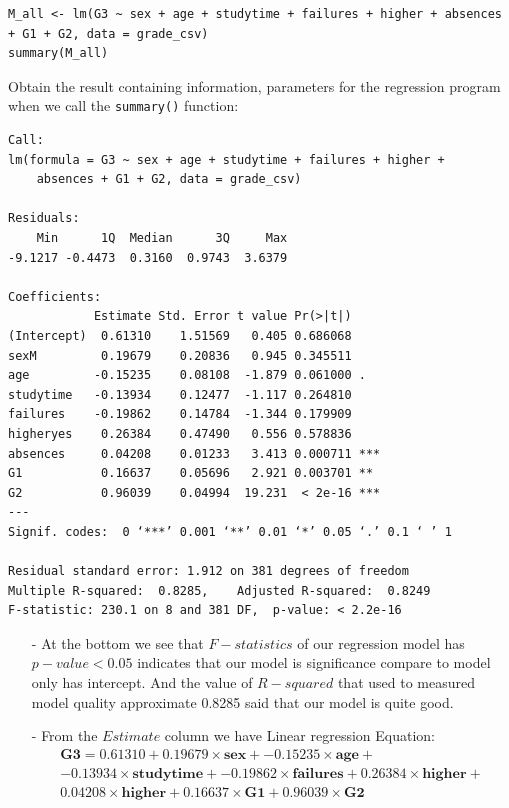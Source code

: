 \documentclass[a4paper]{article}
\numberwithin{equation}{section}
\begin{document}
\begin{mdframed}[leftline=false,rightline=false,backgroundcolor=magenta!10,nobreak=true]
  \begin{verbatim}
M_all <- lm(G3 ~ sex + age + studytime + failures + higher + absences + G1 + G2, data = grade_csv)
summary(M_all)
  \end{verbatim}
\end{mdframed}

Obtain the result containing information, parameters for the regression program when we call the \texttt{summary()} function:
\begin{mdframed}[leftline=false,rightline=false,backgroundcolor=gray!10,nobreak=true]
  \begin{verbatim}
Call:
lm(formula = G3 ~ sex + age + studytime + failures + higher +
    absences + G1 + G2, data = grade_csv)

Residuals:
    Min      1Q  Median      3Q     Max
-9.1217 -0.4473  0.3160  0.9743  3.6379

Coefficients:
            Estimate Std. Error t value Pr(>|t|)
(Intercept)  0.61310    1.51569   0.405 0.686068
sexM         0.19679    0.20836   0.945 0.345511
age         -0.15235    0.08108  -1.879 0.061000 .
studytime   -0.13934    0.12477  -1.117 0.264810
failures    -0.19862    0.14784  -1.344 0.179909
higheryes    0.26384    0.47490   0.556 0.578836
absences     0.04208    0.01233   3.413 0.000711 ***
G1           0.16637    0.05696   2.921 0.003701 **
G2           0.96039    0.04994  19.231  < 2e-16 ***
---
Signif. codes:  0 ‘***’ 0.001 ‘**’ 0.01 ‘*’ 0.05 ‘.’ 0.1 ‘ ’ 1

Residual standard error: 1.912 on 381 degrees of freedom
Multiple R-squared:  0.8285,	Adjusted R-squared:  0.8249
F-statistic: 230.1 on 8 and 381 DF,  p-value: < 2.2e-16
  \end{verbatim}
\end{mdframed}

\begin{itemize}
  \item [-] At the bottom we see that \(F-statistics\) of our regression model has \(p-value < 0.05\) indicates that our model is significance compare to model only has intercept. And the value of \(R-squared\) that used to measured model quality approximate 0.8285 said that our model is quite good.

  \item[-] From the \(Estimate\) column we have Linear regression Equation:
        \begin{multline*}
          \textbf{G3} =  0.61310 + 0.19679\times \textbf{sex} + -0.15235\times \textbf{age} + \\
          -0.13934\times \textbf{studytime} + -0.19862\times \textbf{failures} + 0.26384\times \textbf{higher} + \\ 0.04208\times \textbf{higher} + 0.16637\times \textbf{G1} + 0.96039\times \textbf{G2}
        \end{multline*}
\end{itemize}
\end{document}

